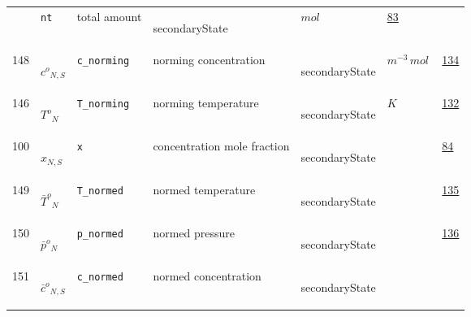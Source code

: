 \begin{longtable}{|p{1cm}|p{2.5cm}|p{4.5cm}|p{8cm}|p{3.0cm}|p{3cm}|p{1cm}|}
             & \verb|nt|
             & total amount
             & \begin{lay}secondaryState \end{lay}
             & $ mol \, $
             &                 \hyperlink{"e:83"}{ 83 }
                 \\
            148
             & \hypertarget{"v:148"}{ $ {{c^o}}{_{N, S}} $}
             & \verb|c_norming|
             & norming concentration
             & \begin{lay}secondaryState \end{lay}
             & $ m^{-3} \,mol \, $
             &                 \hyperlink{"e:134"}{ 134 }
                 \\
            146
             & \hypertarget{"v:146"}{ $ {{T^o}}{_{N}} $}
             & \verb|T_norming|
             & norming temperature
             & \begin{lay}secondaryState \end{lay}
             & $ K \, $
             &                 \hyperlink{"e:132"}{ 132 }
                 \\
            100
             & \hypertarget{"v:100"}{ $ {x}{_{N, S}} $}
             & \verb|x|
             & concentration mole fraction
             & \begin{lay}secondaryState \end{lay}
             & $  $
             &                 \hyperlink{"e:84"}{ 84 }
                 \\
            149
             & \hypertarget{"v:149"}{ $ {{\bar{T}^o}}{_{N}} $}
             & \verb|T_normed|
             & normed temperature
             & \begin{lay}secondaryState \end{lay}
             & $  $
             &                 \hyperlink{"e:135"}{ 135 }
                 \\
            150
             & \hypertarget{"v:150"}{ $ {{\bar{p}^o}}{_{N}} $}
             & \verb|p_normed|
             & normed pressure
             & \begin{lay}secondaryState \end{lay}
             & $  $
             &                 \hyperlink{"e:136"}{ 136 }
                 \\
            151
             & \hypertarget{"v:151"}{ $ {{\bar{c}^o}}{_{N, S}} $}
             & \verb|c_normed|
             & normed concentration
             & \begin{lay}secondaryState \end{lay}

\end{longtable}
